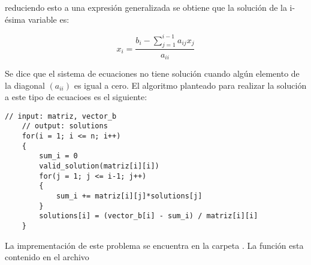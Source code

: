 reduciendo esto a una expresión generalizada se obtiene que la solución de la i-ésima variable es:

\begin{equation*}
    x_i = \frac{b_{i}-\sum\limits_{j=1}^{i-1} a_{ij}x_{j}}{a_{ii}}
\end{equation*}

Se dice que el sistema de ecuaciones no tiene solución cuando algún elemento de la diagonal $(a_{ii})$ es igual a cero.
El algoritmo planteado para realizar la solución a este tipo de ecuacioes es el siguiente:

\begin{lstlisting}[style=CStyle]
    // input: matriz, vector_b
    // output: solutions
    for(i = 1; i <= n; i++)
    {
        sum_i = 0
        valid_solution(matriz[i][i])
        for(j = 1; j <= i-1; j++)
        {
            sum_i += matriz[i][j]*solutions[j]
        }
        solutions[i] = (vector_b[i] - sum_i) / matriz[i][i]
    }

\end{lstlisting}

La imprementación de este problema se encuentra en la carpeta . La función  esta contenido en el archivo 